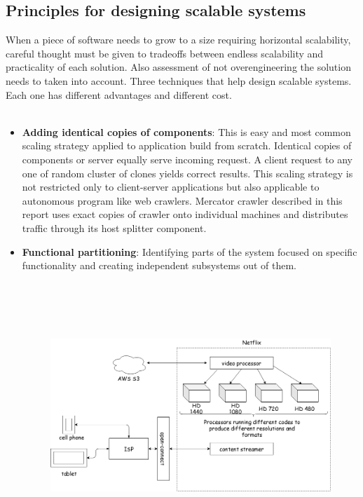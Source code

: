 \subsection{Principles for designing scalable systems}\label{appstate}
When a piece of software needs to grow to a size requiring horizontal scalability, careful thought must
be given to tradeoffs between endless scalability and practicality of each solution. Also assessment of not
overengineering the solution needs to taken into account. Three techniques that help design scalable
systems. Each one has different advantages and different cost.
\\
\\
\begin{itemize}
\item \textbf{Adding identical copies of components}: This is easy and most common scaling strategy
  applied to application build from scratch. Identical copies of components or server equally serve
  incoming request. A client request to any one of random cluster of clones yields correct results.
  This scaling strategy is not restricted only to client-server applications but also applicable to
  autonomous program like web crawlers. Mercator crawler described in this report uses exact copies
  of crawler onto individual machines and distributes traffic through its host splitter component.
\item \textbf{Functional partitioning}: Identifying parts of the system focused on specific functionality
  and creating independent subsystems out of them.
  \begin{figure}[h!]
    \centering
    \includegraphics[width=13cm,height=10cm,keepaspectratio]{../media/crawler/netflix.png}

\end{figure}
\end{itemize}
